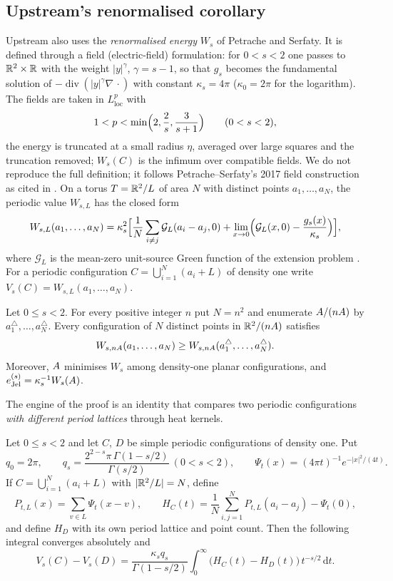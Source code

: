 \subsection{Upstream's renormalised corollary}

Upstream also uses the \emph{renormalised energy} $W_s$ of Petrache and Serfaty. It is defined through a field
(electric-field) formulation: for $0<s<2$ one passes to $\mathbb{R}^2\times\mathbb{R}$ with the weight $|y|^{\gamma}$, $\gamma=s-1$,
so that $g_s$ becomes the fundamental solution of $-\operatorname{div}(|y|^\gamma\nabla\,\cdot)$ with constant
$\kappa_s=4\pi$ ($\kappa_0=2\pi$ for the logarithm). The fields are taken in $L^p_{\mathrm{loc}}$ with
\[
1<p<\min\Bigl(2,\frac2s,\frac3{s+1}\Bigr)\qquad(0<s<2),
\]
the energy is truncated at a small radius $\eta$, averaged over large squares and the truncation removed; $W_s(C)$
is the infimum over compatible fields. We do not reproduce the full definition; it follows Petrache--Serfaty's
2017 field construction as cited in \cite[\S8]{oai}. On a torus $T=\mathbb{R}^2/L$ of area $N$ with distinct points
$a_1,\dots,a_N$, the periodic value $W_{s,L}$ has the closed form
\[
W_{s,L}(a_1,\dots,a_N)=\kappa_s^2\Bigl[\frac1N\sum_{i\ne j}\mathcal G_L(a_i-a_j,0)
+\lim_{x\to0}\Bigl(\mathcal G_L(x,0)-\frac{g_s(x)}{\kappa_s}\Bigr)\Bigr],
\]
where $\mathcal G_L$ is the mean-zero unit-source Green function of the extension problem \cite[\S8]{oai}. For a
periodic configuration $C=\bigcup_{i=1}^N(a_i+L)$ of density one write $V_s(C)=W_{s,L}(a_1,\dots,a_N)$.

\begin{corollary}\label{ch5:cor:jellium}
\tierL{} Let $0\le s<2$. For every positive integer $n$ put $N=n^2$ and enumerate $A/(nA)$ by
$a^\triangle_1,\dots,a^\triangle_N$. Every configuration of $N$ distinct points in $\mathbb{R}^2/(nA)$ satisfies
\[
W_{s,nA}(a_1,\dots,a_N)\ge W_{s,nA}(a^\triangle_1,\dots,a^\triangle_N).
\]
Moreover, $A$ minimises $W_s$ among density-one planar configurations, and
$e^{(s)}_{\mathrm{Jel}}=\kappa_s^{-1}W_s(A)$.
\end{corollary}

The engine of the proof is an identity that compares two periodic configurations \emph{with different period
lattices} through heat kernels.

\begin{lemma}\label{ch5:lem:heat}
\tierL{} Let $0\le s<2$ and let $C$, $D$ be simple periodic configurations of density one. Put
\[
q_0=2\pi,\qquad q_s=\frac{2^{2-s}\pi\,\Gamma(1-s/2)}{\Gamma(s/2)}\ (0<s<2),\qquad
\Psi_t(x)=(4\pi t)^{-1}e^{-|x|^2/(4t)}.
\]
If $C=\bigcup_{i=1}^N(a_i+L)$ with $|\mathbb{R}^2/L|=N$, define
\[
P_{t,L}(x)=\sum_{v\in L}\Psi_t(x-v),\qquad
H_C(t)=\frac1N\sum_{i,j=1}^N P_{t,L}(a_i-a_j)-\Psi_t(0),
\]
and define $H_D$ with its own period lattice and point count. Then the following integral converges absolutely and
\[
V_s(C)-V_s(D)=\frac{\kappa_s q_s}{\Gamma(1-s/2)}\int_0^\infty\bigl(H_C(t)-H_D(t)\bigr)\,t^{-s/2}\,\mathrm{d}t .
\]
\end{lemma}

